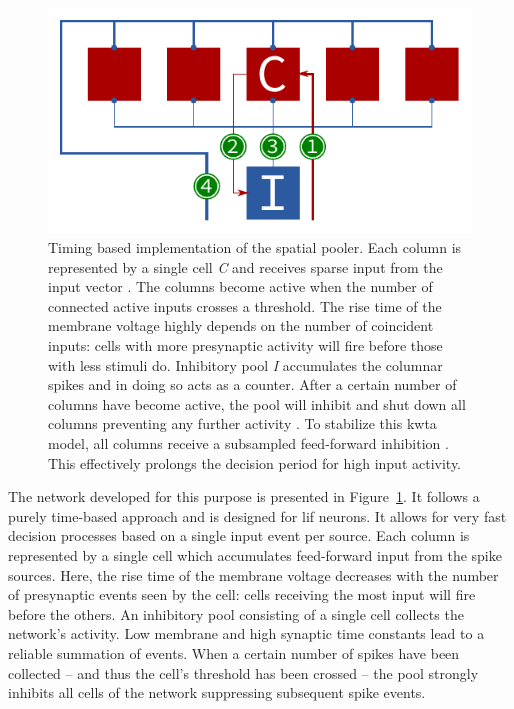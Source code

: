 \begin{figure}
	\begin{center}
		\includegraphics[width=\columnwidth]{../circuitry/spatial_pooler.pdf}
	\end{center}
	\caption{Timing based implementation of the spatial pooler. Each column is
	represented by a single cell \emph{C} and receives sparse input from the input
	vector \protect{}. The columns become active when the number of
	connected active inputs crosses a threshold. The rise time of the membrane
	voltage highly depends on the number of coincident inputs: cells with more
	presynaptic activity will fire before those with less stimuli do. Inhibitory
	pool \emph{I} accumulates the columnar spikes \protect{} and in
	doing so acts as a counter. After a certain number of columns have become
	active, the pool will inhibit and shut down all columns preventing any further
	activity \protect{}. To stabilize this \gls{kwta} model, all
	columns receive a subsampled feed-forward inhibition
	\protect{}. This effectively prolongs the decision period for
	high input activity.}

	\label{fig:spatial_pooler}
\end{figure}

The network developed for this purpose is presented in
Figure~\ref{fig:spatial_pooler}. It follows a purely time-based approach and
is designed for \gls{lif} neurons. It allows for very fast decision processes
based on a single input event per source. Each column is represented by a single
cell which accumulates feed-forward input from the spike sources. Here, the rise
time of the membrane voltage decreases with the number of presynaptic events
seen by the cell: cells receiving the most input will fire before the others. An
inhibitory pool consisting of a single cell collects the network's activity. Low
membrane and high synaptic time constants lead to a reliable summation of
events. When a certain number of spikes have been collected -- and thus the
cell's threshold has been crossed -- the pool strongly inhibits all cells of
the network suppressing subsequent spike events.

